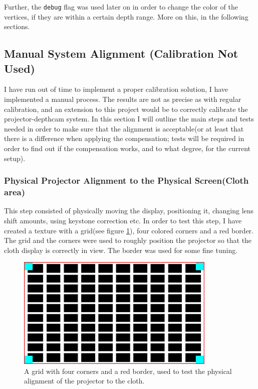 \documentclass[]{article}
\begin{document}
Further, the \verb|debug| flag was used later on in order to change the color of the vertices, if they are within a certain depth range. More on this, in the following sections.


\subsection{Manual System Alignment (Calibration Not Used)}
\label{sec:ManualAlignment}
I have run out of time to implement a proper calibration solution, I have implemented a manual process. The results are not as precise as with regular calibration, and an extension to this project would be to correctly calibrate the projector-depthcam system. In this section I will outline the main steps and tests needed in order to make sure that the alignment is acceptable(or at least that there is a difference when applying the compensation; tests will be required in order to find out if the compensation works, and to what degree, for the current setup).

\subsubsection{Physical Projector Alignment to the Physical Screen(Cloth area)}

This step consisted of physically moving the display, positioning it, changing lens shift amounts, using keystone correction etc. In order to test this step, I have created a texture with a grid(see figure \ref{fig:CalibrationGrid}), four colored corners and a red border. The grid and the corners were used to roughly position the projector so that the cloth display is correctly in view. The border was used for some fine tuning. 

\begin{figure}[hbtp]
    \centering
    \includegraphics[width=0.85\textwidth]{figures/CalibrationGrid.jpg}
    \caption{A grid with four corners and a red border, used to test the physical alignment of the projector to the cloth.}
    \label{fig:CalibrationGrid}
\end{figure}
\end{document}
